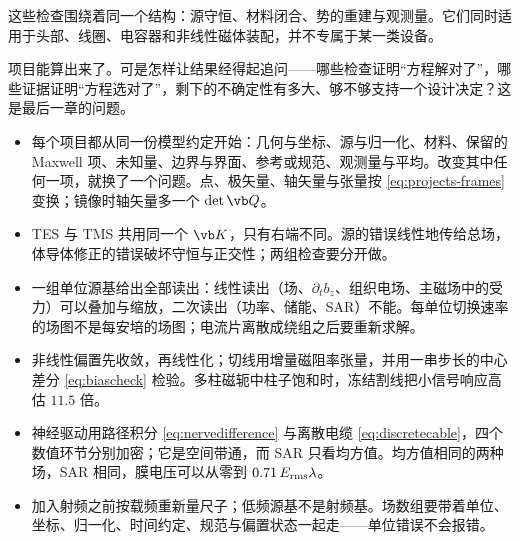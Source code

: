 这些检查围绕着同一个结构：源守恒、材料闭合、势的重建与观测量。它们同时适用于头部、线圈、电容器和非线性磁体装配，并不专属于某一类设备。

项目能算出来了。可是怎样让结果经得起追问——哪些检查证明“方程解对了”，哪些证据证明“方程选对了”，剩下的不确定性有多大、够不够支持一个设计决定？这是最后一章的问题。

\begin{takeaways}
\begin{itemize}
\item 每个项目都从同一份模型约定开始：几何与坐标、源与归一化、材料、保留的 Maxwell 项、未知量、边界与界面、参考或规范、观测量与平均。改变其中任何一项，就换了一个问题。点、极矢量、轴矢量与张量按 \eqref{eq:projects-frames} 变换；镜像时轴矢量多一个 $\det\vb Q$。
\item TES 与 TMS 共用同一个 $\vb K$，只有右端不同。源的错误线性地传给总场，体导体修正的错误破坏守恒与正交性；两组检查要分开做。
\item 一组单位源基给出全部读出：线性读出（场、$\partial_tb_z$、组织电场、主磁场中的受力）可以叠加与缩放，二次读出（功率、储能、SAR）不能。每单位切换速率的场图不是每安培的场图；电流片离散成绕组之后要重新求解。
\item 非线性偏置先收敛，再线性化；切线用增量磁阻率张量，并用一串步长的中心差分 \eqref{eq:biascheck} 检验。多柱磁轭中柱子饱和时，冻结割线把小信号响应高估 $11.5$ 倍。
\item 神经驱动用路径积分 \eqref{eq:nervedifference} 与离散电缆 \eqref{eq:discretecable}，四个数值环节分别加密；它是空间带通，而 SAR 只看均方值。均方值相同的两种场，SAR 相同，膜电压可以从零到 $0.71\,E_{\rm rms}\lambda$。
\item 加入射频之前按载频重新量尺子；低频源基不是射频基。场数组要带着单位、坐标、归一化、时间约定、规范与偏置状态一起走——单位错误不会报错。
\end{itemize}
\end{takeaways}

